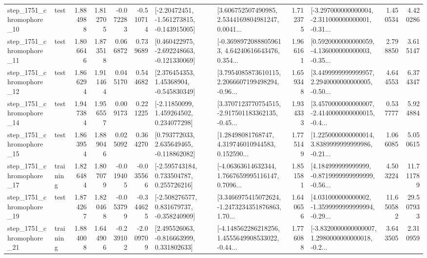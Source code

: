 \begin{tabular}{llrrrrllrlrr}
 step\_1751\_chromophore\_10 &      test &      1.884988 &    1.812705 &     -0.072283 & -0.510714 &   [-2.20472451, -1.561273815, -0.143915005] &  [3.606752507490985, 2.5344169804981247, 0.0041... &       1.712375 &  [-3.297000000000004, -2.311000000000001, -0.31... &            1.450534 &          4.420286 \\
 step\_1751\_chromophore\_11 &      test &      1.806646 &    1.873518 &      0.066872 &  0.739689 &   [0.460422975, -2.692248663, -0.121330069] &  [-0.36989720888059613, 4.64240616643476, 0.354... &       1.966161 &  [0.5920000000000059, -4.136000000000003, -0.35... &            2.798850 &          3.615147 \\
 step\_1751\_chromophore\_12 &      test &      1.866294 &    1.911464 &      0.045170 &  0.544682 &     [2.376454353, 1.45368904, -0.545830349] &  [3.7954085873610115, 2.2066607199498294, -0.96... &       1.659348 &  [3.4499999999999957, 2.2940000000000005, -0.50... &            4.644553 &          6.374347 \\
 step\_1751\_chromophore\_14 &      test &      1.947384 &    1.956557 &      0.009173 &  0.221225 &     [-2.11850099, 1.459264502, 0.234077298] &  [3.3707123770754515, -2.917501183362135, -0.45... &       1.934333 &  [3.4570000000000007, -2.4140000000000015, -0.4... &            0.537777 &          5.924884 \\
 step\_1751\_chromophore\_15 &      test &      1.863954 &    1.889046 &      0.025092 &  0.364270 &    [0.793772033, 2.635649465, -0.118862082] &  [1.28498081768747, 4.319746010944583, 0.152590... &       1.775149 &  [1.2250000000000014, 3.8389999999999986, -0.21... &            1.066085 &          5.050615 \\
 step\_1751\_chromophore\_17 &  training &      1.826484 &    1.807079 &     -0.019405 & -0.035566 &    [-2.595743184, 0.733504787, 0.255726216] &  [-4.06363614632344, 1.7667659995116147, 0.7096... &       1.851581 &  [4.184999999999999, -0.8719999999999999, -0.56... &            4.503224 &         11.711789 \\
 step\_1751\_chromophore\_19 &      test &      1.874267 &    1.820468 &     -0.053799 & -0.344625 &   [-2.508276577, 0.831679737, -0.358240909] &  [3.3466975415072624, -1.2473234351876863, 1.70... &       1.640656 &  [4.031000000000002, -1.3599999999999994, -0.29... &           11.650582 &         29.507933 \\
 step\_1751\_chromophore\_21 &  training &      1.884008 &    1.644906 &     -0.239102 & -2.009709 &    [2.495526063, -0.816663999, 0.331802633] &  [-4.148562286218256, 1.4555649908533022, -0.44... &       1.776088 &  [-3.8320000000000007, 1.2980000000000018, -0.2... &            3.643505 &          2.310959 \\

\end{tabular}
